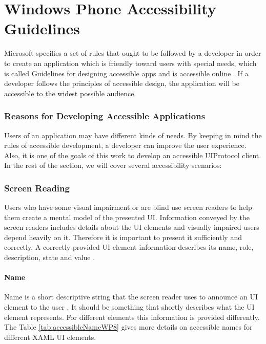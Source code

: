 \section{Windows Phone Accessibility Guidelines}
\label{sec:accGuidelines}
Microsoft specifies a set of rules that ought to be followed by a developer in order to create an application which is friendly toward users with special needs, which is called Guidelines for designing accessible apps and is accessible online \cite{wp8guide}. If a developer follows the principles of accessible design, the application will be accessible to the widest possible audience.

\subsubsection{Reasons for Developing Accessible Applications}
Users of an application may have different kinds of needs. By keeping in mind the rules of accessible development, a developer can improve the user experience. Also, it is one of the goals of this work to develop an accessible UIProtocol client.
\\In the rest of the section, we will cover several accessibility scenarios:

\subsubsection{Screen Reading}
Users who have some visual impairment or are blind use screen readers to help them create a mental model of the presented UI. Information conveyed by the screen readers includes details about the UI elements and visually impaired users depend heavily on it. Therefore it is important to present it sufficiently and correctly.
A correctly provided UI element information describes its name, role, description, state and value \cite{wp8guide}.

\paragraph{Name}
Name is a short descriptive string that the screen reader uses to announce an UI element to the user \cite{wp8guide}. It should be something that shortly describes what the UI element represents. For different elements this information is provided differently. The Table \ref{tab:accessibleNameWP8} gives more details on accessible names for different XAML UI elements.




